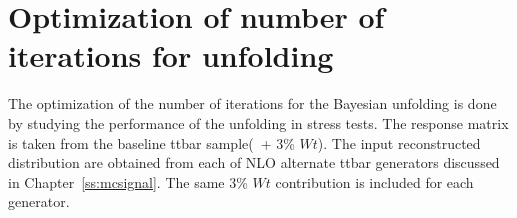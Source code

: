 \section{Optimization of number of iterations for unfolding}
\label{app:stressiter}


The optimization of the number of iterations for the Bayesian unfolding is done by studying the performance of the unfolding in stress tests. The response matrix is taken from the baseline ttbar sample(\powpy\ + 3\% $Wt$). The input reconstructed distribution are obtained from each of NLO alternate ttbar generators discussed in Chapter~\ref{ss:mcsignal}. The same 3\% $Wt$ contribution is included for each generator.


